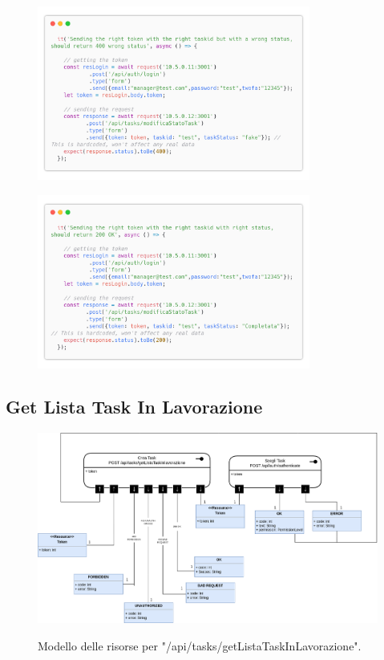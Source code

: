 \documentclass{report}
\begin{document}
\begin{figure}[H]
	\centering\includegraphics[width=0.8\textwidth]{images/code_modifica_stato_test5.png}
\end{figure}
\begin{figure}[H]
	\centering\includegraphics[width=0.8\textwidth]{images/code_modifica_stato_test6.png}
\end{figure}


\subsection*{Get Lista Task In Lavorazione}

\begin{figure}[H]
	\centering\includegraphics[width=1\textwidth]{images/model_in_lavorazione.png}
	
	Modello delle risorse per "/api/tasks/getListaTaskInLavorazione".
\end{figure}
\end{document}
